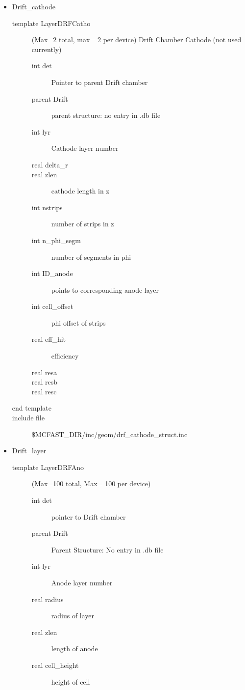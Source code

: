 \begin{itemize}
\item Drift\_cathode
\begin{description}
\item[{\rm template} LayerDRFCatho](Max=2 total, max= 2 per device)  Drift Chamber Cathode (not used currently)
\begin{description}
\item[{\rm  int} det]       Pointer to parent Drift chamber
\item[{\rm  parent} Drift]  parent structure: no entry in .db file
\item[{\rm  int} lyr]       Cathode layer number
\item[{\rm  real} delta\_r] 
\item[{\rm  real} zlen]     cathode length in z
\item[{\rm  int} nstrips]   number of strips in z
\item[{\rm  int} n\_phi\_segm]  number of segments in phi
\item[{\rm  int} ID\_anode] points to corresponding anode layer 
\item[{\rm  int} cell\_offset] phi offset of strips
\item[{\rm  real} eff\_hit] efficiency
\item[{\rm  real} resa]    
\item[{\rm  real} resb]
\item[{\rm  real} resc]
\end{description}
\item[end template]
\item[include file] \$MCFAST\_DIR/inc/geom/drf\_cathode\_struct.inc
\end{description}
\item Drift\_layer
\begin{description}
\item[{\rm template} LayerDRFAno](Max=100 total, Max= 100 per device)
\begin{description}
\item[{\rm  int} det]   pointer to Drift chamber
\item[{\rm  parent} Drift] Parent Structure:  No entry in .db file
\item[{\rm  int} lyr]      Anode layer number
\item[{\rm  real} radius]  radius of layer
\item[{\rm  real} zlen]    length of anode
\item[{\rm  real} cell\_height]  height of cell

\end{description}
\end{description}
\end{itemize}
